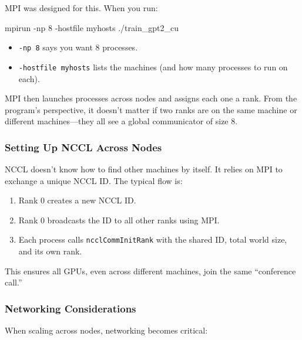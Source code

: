 \documentclass[
  letterpaper,
  DIV=11,
  numbers=noendperiod]{scrreprt}
\newenvironment{Shaded}{\begin{snugshade}}{\end{snugshade}}
\newcommand{\AttributeTok}[1]{\textcolor[rgb]{0.40,0.45,0.13}{#1}}
\newcommand{\ExtensionTok}[1]{\textcolor[rgb]{0.00,0.23,0.31}{#1}}
\newcommand{\NormalTok}[1]{\textcolor[rgb]{0.00,0.23,0.31}{#1}}
\providecommand{\tightlist}{%
  \setlength{\itemsep}{0pt}\setlength{\parskip}{0pt}}
\begin{document}
MPI was designed for this. When you run:

\begin{Shaded}
\begin{Highlighting}[]
\ExtensionTok{mpirun} \AttributeTok{{-}np}\NormalTok{ 8 }\AttributeTok{{-}hostfile}\NormalTok{ myhosts ./train\_gpt2\_cu}
\end{Highlighting}
\end{Shaded}

\begin{itemize}
\tightlist
\item
  \texttt{-np\ 8} says you want 8 processes.
\item
  \texttt{-hostfile\ myhosts} lists the machines (and how many processes
  to run on each).
\end{itemize}

MPI then launches processes across nodes and assigns each one a rank.
From the program's perspective, it doesn't matter if two ranks are on
the same machine or different machines---they all see a global
communicator of size 8.

\subsubsection{Setting Up NCCL Across
Nodes}\label{setting-up-nccl-across-nodes}

NCCL doesn't know how to find other machines by itself. It relies on MPI
to exchange a unique NCCL ID. The typical flow is:

\begin{enumerate}
\def\labelenumi{\arabic{enumi}.}
\tightlist
\item
  Rank 0 creates a new NCCL ID.
\item
  Rank 0 broadcasts the ID to all other ranks using MPI.
\item
  Each process calls \texttt{ncclCommInitRank} with the shared ID, total
  world size, and its own rank.
\end{enumerate}

This ensures all GPUs, even across different machines, join the same
``conference call.''

\subsubsection{Networking
Considerations}\label{networking-considerations}

When scaling across nodes, networking becomes critical:
\end{document}
